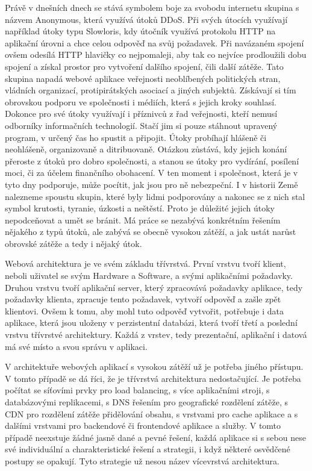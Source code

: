 \documentclass[12pt]{article}
\begin{document}
Právě v dnešních dnech se stává symbolem boje za svobodu internetu skupina s názvem Anonymous, která využívá útoků DDoS. Při svých útocích využívají například útoky typu Slowloris, kdy útočník využívá protokolu HTTP na aplikační úrovni a chce celou odpověď na svůj požadavek. Při navázaném spojení ovšem odesílá HTTP hlavičky co nejpomaleji, aby tak co nejvíce prodloužili dobu spojení a získal prostor pro vytvoření dalšího spojení, čili další zátěže. Tato skupina napadá webové aplikace veřejnosti neoblíbených politických stran, vládních organizací, protipirátských asociací a jiných subjektů. Získávají si tím obrovskou podporu ve společnosti i médiích, která s jejich kroky souhlasí. Dokonce pro své útoky využívají i příznivců z řad veřejnosti, kteří nemusí odborníky informačních technologií. Stačí jim si pouze stáhnout upravený program, v určený čas ho spustit a připojit. Útoky probíhají hlášeně či neohlášeně, organizovaně a ditribuovaně. Otázkou zůstává, kdy jejich konání přeroste z útoků pro dobro společnosti, a stanou se útoky pro vydírání, posílení moci, či za účelem finančního obohacení. V ten moment i společnost, která je v tyto dny podporuje, může pocítit, jak jsou pro ně nebezpeční. I v historii Země nalezneme spoustu skupin, které byly lidmi podporovány a nakonec se z nich stal symbol krutosti, tyranie, úzkosti a neštěstí. Proto je důležité jejich útoky nepodceňovat a umět se bránit. Má práce se nezabývá konkrétním řešením nějakého z typů útoků, ale zabývá se obecně vysokou zátěží, a jak ustát narůst obrovské zátěže a tedy i nějaký útok.\cite{anonymous}



Webová architektura je ve svém základu třívrstvá. První vrstvu tvoří klient, neboli uživatel se svým Hardware a Software, a svými aplikačními požadavky. Druhou vrstvu tvoří aplikační server, který zpracovává požadavky aplikace, tedy požadavky klienta, zpracuje tento požadavek, vytvoří odpověď a zašle zpět klientovi. Ovšem k tomu, aby mohl tuto odpověď vytvořit, potřebuje i data aplikace, která jsou uloženy v perzistentní databázi, která tvoří třetí a poslední vrstvu třívrstvé architektury. Každá z vrstev, tedy prezentační, aplikační i datová má své místo a svou správu v aplikaci.\cite{tri-vrstvy}

\obrazek
{}

V architektuře webových aplikací s vysokou zátěží už je potřeba jiného přístupu. V tomto případě se dá říci, že je třívrstvá architektura nedostačující. Je potřeba počítat se síťovími prvky pro load balancing, s více aplikačními stroji, s databázovými replikacemi, s DNS řešením pro geografické rozdělení zátěže, s CDN pro rozdělení zátěže přidělování obsahu, s vrstvami pro cache aplikace a s dalšími vrstvami pro backendové či frontendové aplikace a služby. V tomto případě neexstuje žádné jasně dané a pevné řešení, každá aplikace si s sebou nese své individuální a charakteristické řešení a strategii, i když některé osvědčené postupy se opakují. Tyto strategie už nesou název vícevrstvá architektura.
\end{document}
